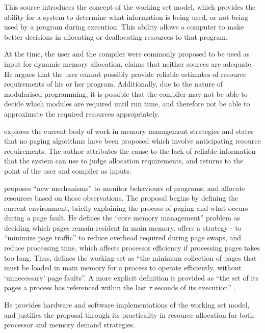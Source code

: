 This source introduces the concept of the working set model, which provides the ability for a system to determine what information is being used, or not being used by a program during execution. This ability allows a computer to make better decisions in allocating or deallocating resources to that program.

At the time, the user and the compiler were commonly proposed to be used as input for dynamic memory allocation. \citet[p. 15.1]{Denning1967} claims that neither sources are adequate. He argues that the user cannot possibly provide reliable estimates of resource requirements of his or her program. Additionally, due to the nature of modularised programming, it is possible that the compiler may not be able to decide which modules are required until run time, and therefore not be able to approximate the required resources appropriately.

\citet{Denning1967} explores the current body of work in memory management strategies and states that no paging algorithms have been proposed which involve anticipating resource requirements. The author attributes the cause to the lack of reliable information that the system can use to judge allocation requirements, and returns to the point of the user and compiler as inputs.

\citet[p. 15.2]{Denning1967} proposes ``new mechanisms'' to monitor behaviours of programs, and allocate resources based on those observations. The proposal begins by defining the current environment, briefly explaining the process of paging and what occurs during a page fault. He defines the ``core memory management'' problem as deciding which pages remain resident in main memory. \citet[p. 15.3]{Denning1967} offers a strategy - to ``minimize page traffic'' to reduce overhead required during page swaps, and reduce processing time, which affects processor efficiency if processing pages takes too long. Thus, \citet[p. 15.3]{Denning1967} defines the working set as ``the minimum collection of pages that must be loaded in main memory for a process to operate efficiently, without `unnecessary' page faults''. A more explicit definition is provided as ``the set of its pages a process has referenced within the last $\tau$ seconds of its execution'' \citep[p. 15.4]{Denning1967}.  

He provides hardware and software implementations of the working set model, and justifies the proposal through its practicality in resource allocation for both processor and memory demand strategies.

